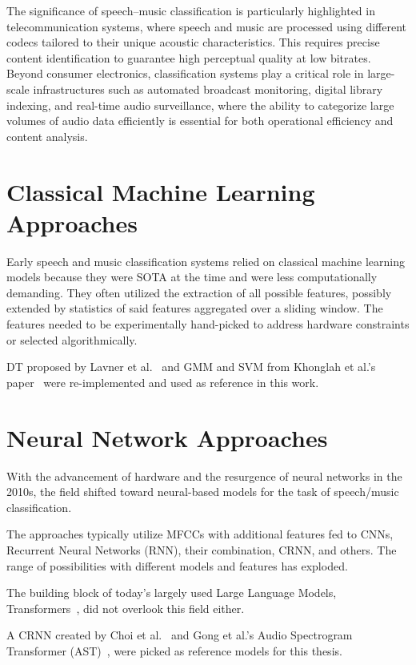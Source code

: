The significance of speech–music classification is particularly highlighted in telecommunication systems, where speech and music are processed using different codecs tailored to their unique acoustic characteristics.
This requires precise content identification to guarantee high perceptual quality at low bitrates.
Beyond consumer electronics, classification systems play a critical role in large-scale infrastructures such as automated broadcast monitoring, digital library indexing, and real-time audio surveillance, where the ability to categorize large volumes of audio data efficiently is essential for both operational efficiency and content analysis.

\section{Classical Machine Learning Approaches}
\label{sec:theory_classical}
Early speech and music classification systems relied on classical machine learning models because they were SOTA at the time and were less computationally demanding.
They often utilized the extraction of all possible features, possibly extended by statistics of said features aggregated over a sliding window.
The features needed to be experimentally hand-picked to address hardware constraints or selected algorithmically.

DT proposed by Lavner et al.~\cite{Lavner2009-zo} and GMM and SVM from Khonglah et al.'s paper~\cite{KHONGLAH201671} were re-implemented and used as reference in this work.

\section{Neural Network Approaches}
\label{sec:theory_nn}
With the advancement of hardware and the resurgence of neural networks in the 2010s, the field shifted toward neural-based models for the task of speech/music classification.

The approaches typically utilize MFCCs with additional features fed to CNNs, Recurrent Neural Networks (RNN), their combination, CRNN, and others. 
The range of possibilities with different models and features has exploded.

The building block of today's largely used Large Language Models, Transformers~\cite{vaswani2023attentionneed}, did not overlook this field either.

A CRNN created by Choi et al.~\cite{choi2016convolutionalrecurrentneuralnetworks} and Gong et al.'s Audio Spectrogram Transformer (AST)~\cite{gong2021astaudiospectrogramtransformer}, were picked as reference models for this thesis.

